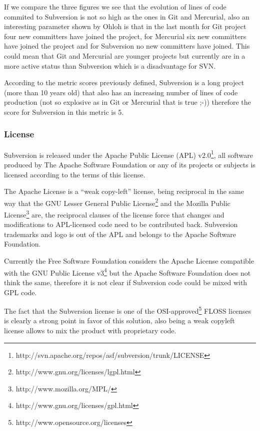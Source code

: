 \documentclass[a4paper,10pt]{article}
\begin{document}
If we compare the three figures we see that the evolution of lines of code commited to Subversion is not so high as the ones in Git and Mercurial, also an interesting parameter shown by Ohloh is that in the last month for Git project four new committers have joined the project, for Mercurial six new committers have joined the project and for Subversion no new committers have joined. This could mean that Git and Mercurial are younger projects but currently are in a more active status than Subversion which is a disadvantage for SVN.

According to the metric scores previously defined, Subversion is a long project (more than 10 years old) that also has an increasing number of lines of code production (not so explosive as in Git or Mercurial that is true ;-)) therefore the score for Subversion in this metric is 5.

\subsubsection{License}

Subversion is released under the Apache Public License (APL) v2.0\footnote{http://svn.apache.org/repos/asf/subversion/trunk/LICENSE}, all software produced by The Apache Software Foundation or any of its projects or subjects is licensed according to the terms of this license.

The Apache License is a “weak copy-left” license, being reciprocal in the same way that the GNU Lesser General Public License\footnote{http://www.gnu.org/licenses/lgpl.html} and the Mozilla Public License\footnote{http://www.mozilla.org/MPL/} are, the reciprocal clauses of the license force that changes and modifications to APL-licensed code need to be contributed back. Subversion trademarks and logo is out of the APL and belongs to the Apache Software Foundation. 

Currently the Free Software Foundation considers the Apache License compatible with the GNU Public License v3\footnote{http://www.gnu.org/licenses/gpl.html} but the Apache Software Foundation does not think the same\cite{APL}, therefore it is not clear if Subversion code could be mixed with GPL code.

The fact that the Subversion license is one of the
OSI-approved\footnote{http://www.opensource.org/licenses} FLOSS licenses is
clearly a strong point in favor of this solution, also being a weak copyleft
license allows to mix the product with proprietary code.
\end{document}
